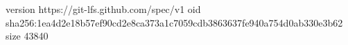 version https://git-lfs.github.com/spec/v1
oid sha256:1ea4d2e18b57ef90cd2e8ca373a1c7059cdb3863637fe940a754d0ab330e3b62
size 43840
